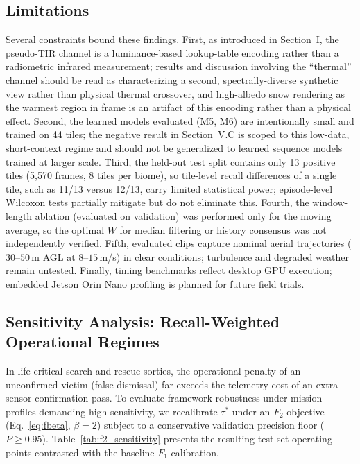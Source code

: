 \documentclass[conference]{IEEEtran}
\begin{document}
\subsection{Limitations}
Several constraints bound these findings. First, as introduced in Section~I, the pseudo-TIR channel is a luminance-based lookup-table encoding rather than a radiometric infrared measurement; results and discussion involving the ``thermal'' channel should be read as characterizing a second, spectrally-diverse synthetic view rather than physical thermal crossover, and high-albedo snow rendering as the warmest region in frame is an artifact of this encoding rather than a physical effect. Second, the learned models evaluated (M5, M6) are intentionally small and trained on 44 tiles; the negative result in Section~V.C is scoped to this low-data, short-context regime and should not be generalized to learned sequence models trained at larger scale. Third, the held-out test split contains only 13 positive tiles (5,570 frames, 8 tiles per biome), so tile-level recall differences of a single tile, such as 11/13 versus 12/13, carry limited statistical power; episode-level Wilcoxon tests partially mitigate but do not eliminate this. Fourth, the window-length ablation (evaluated on validation) was performed only for the moving average, so the optimal $W$ for median filtering or history consensus was not independently verified. Fifth, evaluated clips capture nominal aerial trajectories ($30$--$50$\,m AGL at $8$--$15$\,m/s) in clear conditions; turbulence and degraded weather remain untested. Finally, timing benchmarks reflect desktop GPU execution; embedded Jetson Orin Nano profiling is planned for future field trials.

\subsection{Sensitivity Analysis: Recall-Weighted Operational Regimes}
\label{sec:sensitivity_analysis}
In life-critical search-and-rescue sorties, the operational penalty of an unconfirmed victim (false dismissal) far exceeds the telemetry cost of an extra sensor confirmation pass. To evaluate framework robustness under mission profiles demanding high sensitivity, we recalibrate $\tau^*$ under an $F_2$ objective (Eq.~\eqref{eq:fbeta}, $\beta=2$) subject to a conservative validation precision floor ($P \ge 0.95$). Table~\ref{tab:f2_sensitivity} presents the resulting test-set operating points contrasted with the baseline $F_1$ calibration.
\end{document}
